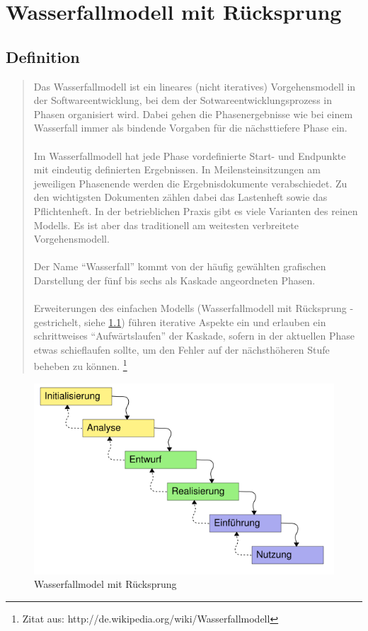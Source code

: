 \chapter{Wasserfallmodell mit Rücksprung}
\section{Definition}
\begin{quote}
Das Wasserfallmodell ist ein lineares (nicht iteratives) Vorgehensmodell in der Softwareentwicklung, bei dem der
 Sotwareentwicklungsprozess in Phasen organisiert wird. Dabei gehen die Phasenergebnisse wie bei einem Wasserfall immer
als bindende Vorgaben für die nächsttiefere Phase ein.\ \\ \\
Im Wasserfallmodell hat jede Phase vordefinierte Start- und Endpunkte mit eindeutig definierten Ergebnissen.
In Meilensteinsitzungen am jeweiligen Phasenende werden die Ergebnisdokumente verabschiedet. Zu den wichtigsten
Dokumenten zählen dabei das Lastenheft sowie das Pflichtenheft. In der betrieblichen Praxis gibt es viele Varianten
des reinen Modells. Es ist aber das traditionell am weitesten verbreitete Vorgehensmodell.\ \\ \\
Der Name ``Wasserfall'' kommt von der häufig gewählten grafischen Darstellung der fünf bis sechs als Kaskade
angeordneten Phasen. \\ \\
Erweiterungen des einfachen Modells (Wasserfallmodell mit Rücksprung - gestrichelt, siehe \ref{w_model}) führen iterative Aspekte ein und erlauben
ein schrittweises ``Aufwärtslaufen'' der Kaskade, sofern in der aktuellen Phase etwas schieflaufen sollte,
um den Fehler auf der nächsthöheren Stufe beheben zu können.
\footnote{Zitat aus:  http://de.wikipedia.org/wiki/Wasserfallmodell}
\end{quote}
\begin{figure}[h]
\centering
\includegraphics[width=\textwidth]{./gfx/misc/567px-Wasserfallmodell.png}
\caption{Wasserfallmodel mit Rücksprung}
\label{w_model}
\end{figure}
\newpage


